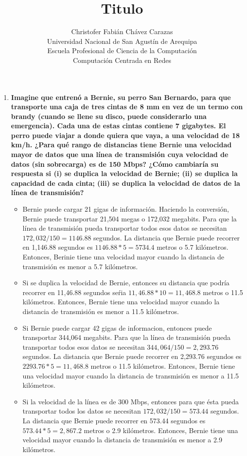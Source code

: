 \documentclass[a4paper,12pt]{article}
\begin{document}
\title{Titulo}
\author{
Christofer Fabián Chávez Carazas \\
\small{Universidad Nacional de San Agustín de Arequipa} \\
\small{Escuela Profesional de Ciencia de la Computación} \\
\small{Computación Centrada en Redes}
}
\date{}

\maketitle

\begin{enumerate}
 \item \textbf{Imagine que entrenó a Bernie, su perro San Bernardo, para que transporte una caja de tres cintas de 8 mm
en vez de un termo con brandy (cuando se llene su disco, puede considerarlo una emergencia). Cada una de
estas cintas contiene 7 gigabytes. El perro puede viajar a donde quiera que vaya, a una velocidad de 18 km/h.
¿Para qué rango de distancias tiene Bernie una velocidad mayor de datos que una línea de transmisión cuya
velocidad de datos (sin sobrecarga) es de 150 Mbps? ¿Cómo cambiaría su respuesta si (i) se duplica la velocidad
de Bernie; (ii) se duplica la capacidad de cada cinta; (iii) se duplica la velocidad de datos de la línea
de transmisión?}

\begin{itemize}
 \item Bernie puede cargar 21 gigas de información. Haciendo la conversión, Bernie puede transportar 21,504 megas o 172,032 megabits.
  Para que la línea de transmisión pueda transportar todos esos datos se necesitan $172,032 / 150 = 1146.88$ segundos.
  La distancia que Bernie puede recorrer en 1,146.88 segundos es $1146.88 * 5 = 5734.4$ metros o 5.7 kilómetros. Entonces, Berinie
  tiene una velocidad mayor cuando la distancia de transmisión es menor a 5.7 kilómetros.
 \item Si se duplica la velocidad de Bernie, entonces su distancia que podría recorrer en 11,46.88 segundos seŕia $11,46.88 * 10 = 11,468.8$ metros o 11.5 kilómetros.
  Entonces, Bernie tiene una velocidad mayor cuando la distancia de transmisión es menor a 11.5 kilómetros.
 \item Si Bernie puede cargar 42 gigas de informacion, entonces puede transportar 344,064 megabits. Para que la línea de transmisión pueda transportar todos esos datos
  se necesitan $344,064 / 150 = 2,293.76$ segundos. La distancia que Bernie puede recorrer en 2,293.76 segundos es $2293.76 * 5 = 11,468.8$ metros o 11.5 kilómetros.
  Entonces, Bernie tiene una velocidad mayor cuando la distancia de transmisión es menor a 11.5 kilómetros.
 \item Si la velocidad de la línea es de 300 Mbps, entonces para que ésta pueda transportar todos los datos se necesitan $172,032/ 150 = 573.44$ segundos.
  La distancia que Bernie puede recorrer en 573.44 segundos es $573.44 * 5 = 2,867.2$ metros o 2.9 kilómetros.
  Entonces, Bernie tiene una  velocidad mayor cuando la distancia de transmisión es menor a 2.9 kilómetros.
\end{itemize}


\end{enumerate}
\end{document}
